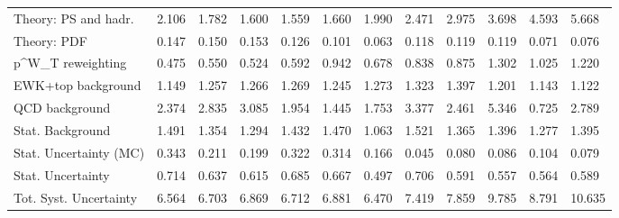 \begin{tabular}{l|p{0.6cm}p{0.6cm}p{0.6cm}p{0.6cm}p{0.6cm}p{0.6cm}p{0.6cm}p{0.6cm}p{0.6cm}p{0.6cm}p{0.6cm}}
Theory: PS and hadr.                     & 2.106 & 1.782 & 1.600 & 1.559 & 1.660 & 1.990 & 2.471 & 2.975 & 3.698 & 4.593 & 5.668 \\
Theory: PDF                              & 0.147 & 0.150 & 0.153 & 0.126 & 0.101 & 0.063 & 0.118 & 0.119 & 0.119 & 0.071 & 0.076 \\
p^{W}_{T} reweighting                    & 0.475 & 0.550 & 0.524 & 0.592 & 0.942 & 0.678 & 0.838 & 0.875 & 1.302 & 1.025 & 1.220 \\
EWK+top background                       & 1.149 & 1.257 & 1.266 & 1.269 & 1.245 & 1.273 & 1.323 & 1.397 & 1.201 & 1.143 & 1.122 \\
QCD background                           & 2.374 & 2.835 & 3.085 & 1.954 & 1.445 & 1.753 & 3.377 & 2.461 & 5.346 & 0.725 & 2.789 \\
Stat. Background                         & 1.491 & 1.354 & 1.294 & 1.432 & 1.470 & 1.063 & 1.521 & 1.365 & 1.396 & 1.277 & 1.395 \\
Stat. Uncertainty (MC)                   & 0.343 & 0.211 & 0.199 & 0.322 & 0.314 & 0.166 & 0.045 & 0.080 & 0.086 & 0.104 & 0.079 \\
\hline
Stat. Uncertainty                        & 0.714 & 0.637 & 0.615 & 0.685 & 0.667 & 0.497 & 0.706 & 0.591 & 0.557 & 0.564 & 0.589 \\
\hline
Tot. Syst. Uncertainty                   & 6.564 & 6.703 & 6.869 & 6.712 & 6.881 & 6.470 & 7.419 & 7.859 & 9.785 & 8.791 & 10.635 \\
\hline
\end{tabular}

